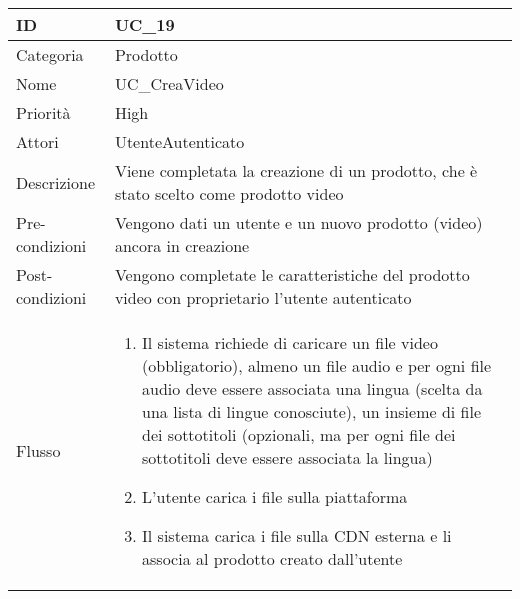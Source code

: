 \begin{center}
\begin{tabular}{ |p{2cm}|p{13cm}|  }
\hline
ID & UC\_19\\\hline
Categoria & Prodotto \\\hline
Nome & UC\_CreaVideo \\\hline
Priorità & High \\\hline
Attori &  UtenteAutenticato \\\hline
Descrizione & Viene completata la creazione di un prodotto, che è stato scelto come prodotto video\\\hline
Pre-condizioni &   Vengono dati un utente e un nuovo prodotto (video) ancora in creazione\\\hline
Post-condizioni &  Vengono completate le caratteristiche del prodotto video con proprietario l'utente autenticato\\\hline
Flusso &  	\begin{enumerate}
			\item Il sistema richiede di caricare un file video (obbligatorio), almeno un file audio e per ogni file audio deve essere associata una lingua (scelta da una lista di lingue conosciute), un insieme di file dei sottotitoli (opzionali, ma per ogni file dei sottotitoli deve essere associata la lingua)
			\item L'utente carica i file sulla piattaforma
			\item Il sistema carica i file sulla CDN esterna e li associa al prodotto creato dall'utente
		\end{enumerate}\\\hline
\end{tabular}
\label{table_use_case:19}\newline


\end{center}

